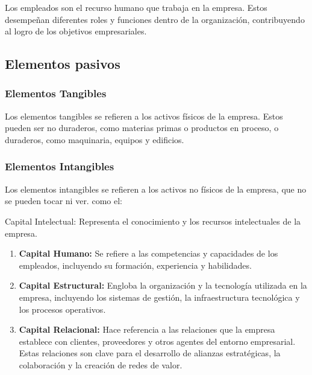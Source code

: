 \documentclass[
  letterpaper,
  DIV=11,
  numbers=noendperiod]{scrartcl}
\begin{document}
Los empleados son el recurso humano que trabaja en la empresa. Estos
desempeñan diferentes roles y funciones dentro de la organización,
contribuyendo al logro de los objetivos empresariales.

\hypertarget{elementos-pasivos}{%
\subsection{Elementos pasivos}\label{elementos-pasivos}}

\hypertarget{elementos-tangibles}{%
\subsubsection{Elementos Tangibles}\label{elementos-tangibles}}

Los elementos tangibles se refieren a los activos físicos de la empresa.
Estos pueden ser no duraderos, como materias primas o productos en
proceso, o duraderos, como maquinaria, equipos y edificios.

\hypertarget{elementos-intangibles}{%
\subsubsection{Elementos Intangibles}\label{elementos-intangibles}}

Los elementos intangibles se refieren a los activos no físicos de la
empresa, que no se pueden tocar ni ver. como el:

Capital Intelectual: Representa el conocimiento y los recursos
intelectuales de la empresa.

\begin{enumerate}
\def\labelenumi{\alph{enumi}.}
\item
  \textbf{Capital Humano:} Se refiere a las competencias y capacidades
  de los empleados, incluyendo su formación, experiencia y habilidades.
\item
  \textbf{Capital Estructural:} Engloba la organización y la tecnología
  utilizada en la empresa, incluyendo los sistemas de gestión, la
  infraestructura tecnológica y los procesos operativos.
\item
  \textbf{Capital Relacional:} Hace referencia a las relaciones que la
  empresa establece con clientes, proveedores y otros agentes del
  entorno empresarial. Estas relaciones son clave para el desarrollo de
  alianzas estratégicas, la colaboración y la creación de redes de
  valor.
\end{enumerate}
\end{document}
